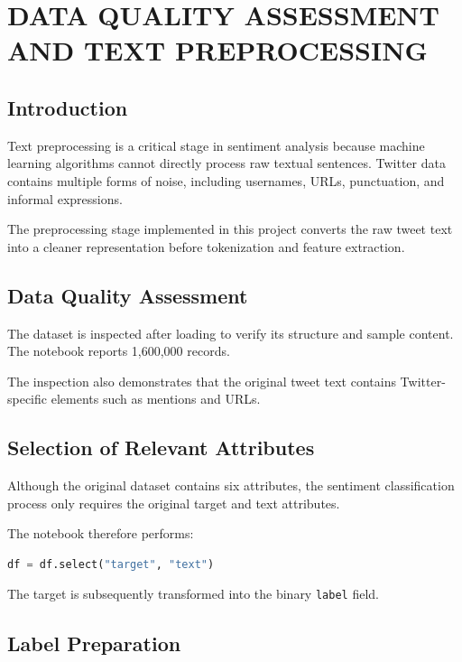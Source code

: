 \documentclass[12pt,a4paper]{article}
\begin{document}

\section{DATA QUALITY ASSESSMENT AND TEXT PREPROCESSING}

\subsection{Introduction}

Text preprocessing is a critical stage in sentiment analysis because machine learning algorithms cannot directly process raw textual sentences. Twitter data contains multiple forms of noise, including usernames, URLs, punctuation, and informal expressions.

The preprocessing stage implemented in this project converts the raw tweet text into a cleaner representation before tokenization and feature extraction.

\subsection{Data Quality Assessment}

The dataset is inspected after loading to verify its structure and sample content. The notebook reports 1,600,000 records.

The inspection also demonstrates that the original tweet text contains Twitter-specific elements such as mentions and URLs.

\subsection{Selection of Relevant Attributes}

Although the original dataset contains six attributes, the sentiment classification process only requires the original target and text attributes.

The notebook therefore performs:

\begin{lstlisting}[language=Python]
df = df.select("target", "text")
\end{lstlisting}

The target is subsequently transformed into the binary \texttt{label} field.

\subsection{Label Preparation}
\end{document}
